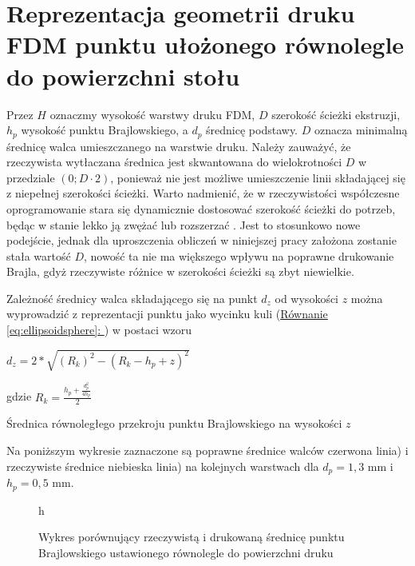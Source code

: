 \documentclass[12pt,a4paper]{article}
\newcommand*{\feqref}[1]{(\hyperref[{#1}]{Równanie \ref{#1}: \nameref*{#1}})}
\begin{document}
\section{Reprezentacja geometrii druku FDM punktu ułożonego równolegle do powierzchni stołu}

Przez $H$ oznaczmy wysokość warstwy druku FDM, $D$ szerokość ścieżki ekstruzji, $h_p$ wysokość punktu Brajlowskiego, a $d_p$ średnicę podstawy.
$D$ oznacza minimalną średnicę walca umieszczanego na warstwie druku. Należy zauważyć, że rzeczywista wytłaczana średnica jest skwantowana do wielokrotności $D$ w przedziale $(0; D \cdot 2)$, ponieważ nie jest możliwe umieszczenie linii składającej się z niepełnej szerokości ścieżki.
Warto nadmienić, że w rzeczywistości współczesne oprogramowanie stara się dynamicznie dostosować szerokość ścieżki do potrzeb, będąc w stanie lekko ją zwężać lub rozszerzać \cite{arachne}. Jest to stosunkowo nowe podejście, jednak dla uproszczenia obliczeń w niniejszej pracy założona zostanie stała wartość $D$, nowość ta nie ma większego wpływu na poprawne drukowanie Brajla, gdyż rzeczywiste różnice w szerokości ścieżki są zbyt niewielkie.

Zależność średnicy walca składającego się na punkt $d_z$ od wysokości $z$ można wyprowadzić z reprezentacji punktu jako wycinku kuli \feqref{eq:ellipsoidsphere} w postaci wzoru

\begin{feq}
$d_z = 2 * \sqrt{(R_k)^2 - (R_k - h_p + z)^2}$

gdzie $R_k = \frac{h_p + \frac{d_p^2}{4h_p}}{2}$

\caption{Średnica równoległego przekroju punktu Brajlowskiego na wysokości $z$}
\label{eq:braille_p_dz}
\end{feq}

Na poniższym wykresie zaznaczone są poprawne średnice walców czerwona linia) i rzeczywiste średnice niebieska linia) na kolejnych warstwach dla $d_p = 1{,}3 \text{ mm}$ i $h_p = 0{,}5 \text{ mm}$.

\begin{figure}{h}
\caption{Wykres porównujący rzeczywistą i drukowaną średnicę punktu Brajlowskiego ustawionego równolegle do powierzchni druku}
\end{figure}
\end{document}
